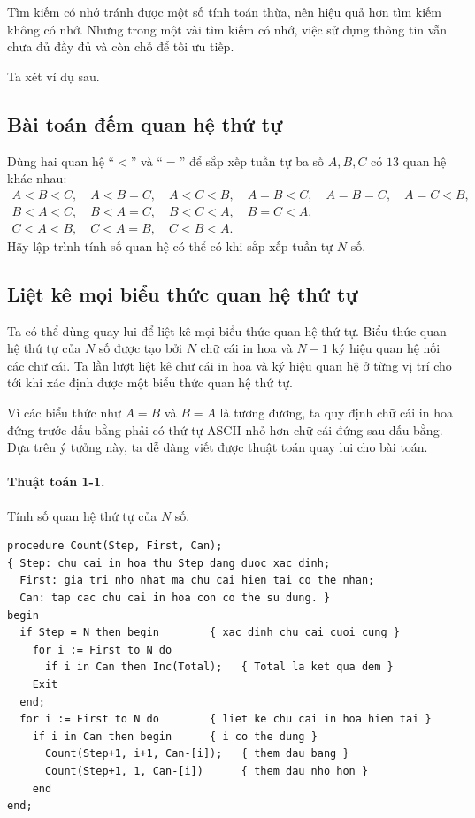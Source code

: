 \documentclass[11pt]{article}
\begin{document}
Tìm kiếm có nhớ tránh được một số tính toán thừa, nên hiệu quả hơn tìm kiếm
không có nhớ. Nhưng trong một vài tìm kiếm có nhớ, việc sử dụng thông tin vẫn
chưa đủ đầy đủ và còn chỗ để tối ưu tiếp.

Ta xét ví dụ sau.

\subsection*{Bài toán đếm quan hệ thứ tự}

Dùng hai quan hệ ``\(<\)'' và ``\(=\)'' để sắp xếp tuần tự ba số \(A,B,C\) có
\(13\) quan hệ khác nhau:
\[
\begin{gathered}
A<B<C,\quad A<B=C,\quad A<C<B,\quad A=B<C,\quad A=B=C,\quad A=C<B,\\
B<A<C,\quad B<A=C,\quad B<C<A,\quad B=C<A,\\
C<A<B,\quad C<A=B,\quad C<B<A.
\end{gathered}
\]
Hãy lập trình tính số quan hệ có thể có khi sắp xếp tuần tự \(N\) số.

\subsection{Liệt kê mọi biểu thức quan hệ thứ tự}

Ta có thể dùng quay lui để liệt kê mọi biểu thức quan hệ thứ tự. Biểu thức
quan hệ thứ tự của \(N\) số được tạo bởi \(N\) chữ cái in hoa và \(N-1\) ký
hiệu quan hệ nối các chữ cái. Ta lần lượt liệt kê chữ cái in hoa và ký hiệu
quan hệ ở từng vị trí cho tới khi xác định được một biểu thức quan hệ thứ tự.

Vì các biểu thức như \(A=B\) và \(B=A\) là tương đương, ta quy định chữ cái in
hoa đứng trước dấu bằng phải có thứ tự ASCII nhỏ hơn chữ cái đứng sau dấu
bằng. Dựa trên ý tưởng này, ta dễ dàng viết được thuật toán quay lui cho bài
toán.

\paragraph{Thuật toán 1-1.} Tính số quan hệ thứ tự của \(N\) số.

\begin{verbatim}
procedure Count(Step, First, Can);
{ Step: chu cai in hoa thu Step dang duoc xac dinh;
  First: gia tri nho nhat ma chu cai hien tai co the nhan;
  Can: tap cac chu cai in hoa con co the su dung. }
begin
  if Step = N then begin        { xac dinh chu cai cuoi cung }
    for i := First to N do
      if i in Can then Inc(Total);   { Total la ket qua dem }
    Exit
  end;
  for i := First to N do        { liet ke chu cai in hoa hien tai }
    if i in Can then begin      { i co the dung }
      Count(Step+1, i+1, Can-[i]);   { them dau bang }
      Count(Step+1, 1, Can-[i])      { them dau nho hon }
    end
end;
\end{verbatim}
\end{document}

